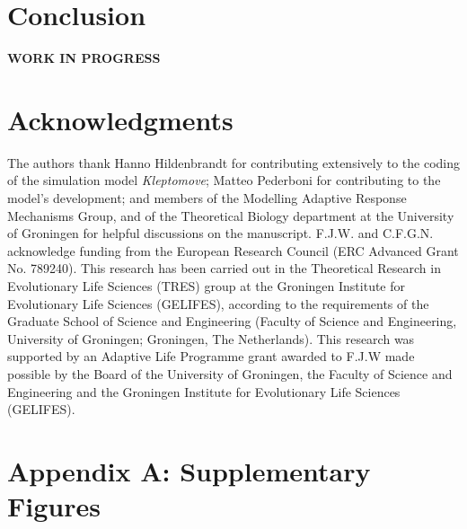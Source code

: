 \documentclass[11pt]{article}
\begin{document}
\section{Conclusion}

\textbf{WORK IN PROGRESS}


\section{Acknowledgments}

The authors thank Hanno Hildenbrandt for contributing extensively to the coding of the simulation model \textit{Kleptomove};
Matteo Pederboni for contributing to the model's development; 
and members of the Modelling Adaptive Response Mechanisms Group, and of the Theoretical Biology department at the University of Groningen for helpful discussions on the manuscript.
F.J.W. and C.F.G.N. acknowledge funding from the European Research Council (ERC Advanced Grant No. 789240).
This research has been carried out in the Theoretical Research in Evolutionary Life Sciences (TRES) group at the Groningen Institute for Evolutionary Life Sciences (GELIFES), according to the requirements of the Graduate School of Science and Engineering (Faculty of Science and Engineering, University of Groningen; Groningen, The  Netherlands).
This research was supported by an Adaptive Life Programme grant awarded to F.J.W made possible by the Board of the University of Groningen, the Faculty of Science and Engineering and the Groningen Institute for Evolutionary Life Sciences (GELIFES).




\newpage{}

\section{Appendix A: Supplementary Figures}
\end{document}
